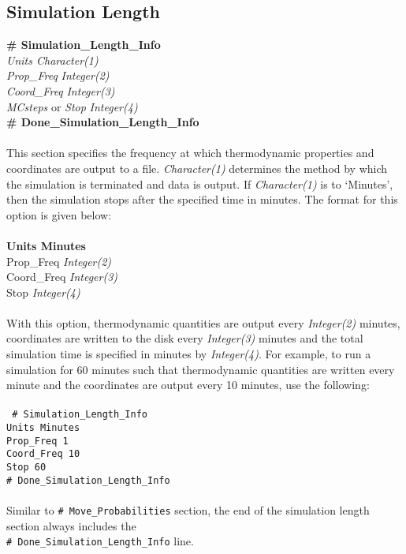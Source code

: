 \subsection{Simulation Length}\label{sec:Simulation_Length_Info}
{\bf \# Simulation\_Length\_Info} \\
{\it Units  Character(1)} \\
{\it Prop\_Freq} {\it Integer(2)} \\
{\it Coord\_Freq} {\it Integer(3)} \\
{\it MCsteps} or {\em Stop} {\it Integer(4)} \\ 
{\bf \# Done\_Simulation\_Length\_Info} \\ \\
%
This section specifies the frequency at which thermodynamic properties and coordinates are output
to a file. {\it Character(1)} determines the method by which the simulation is terminated and
data is output. If {\it Character(1)} is to `Minutes', then the simulation stops after the specified 
time in minutes. The format for this option is given below: \\ \\
%
{\bf Units    Minutes} \\
Prop\_Freq       {\it Integer(2) }\\
Coord\_Freq        {\it Integer(3)} \\
Stop                  {\it Integer(4)} \\ \\
%
With this option, thermodynamic quantities are output every {\it Integer(2)} minutes, 
coordinates are written to the disk every {\it Integer(3)} minutes and the total simulation
time is specified in minutes by {\it Integer(4)}. For example, to run a simulation for 60 minutes
such that thermodynamic quantities are written every minute and the coordinates are output
every 10 minutes, use the following: \\ \\
%
\texttt{
\# Simulation\_Length\_Info \\
Units    Minutes \\
Prop\_Freq    1 \\
Coord\_Freq       10 \\
Stop                 60 \\ 
\# Done\_Simulation\_Length\_Info \\ \\}
%
Similar to \texttt{\# Move\_Probabilities} section, the end of the simulation length section 
always includes the \\ \texttt{\#~Done\_Simulation\_Length\_Info} line. \\ \\
